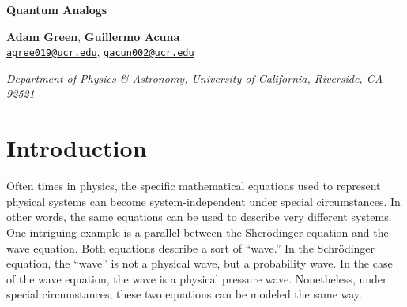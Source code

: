 \documentclass[12pt]{article}
\newcommand{\red}[1]{\textbf{\textcolor{red}{#1}}} %
\newcommand{\email}[1]{\href{mailto:#1}{#1}}
\newenvironment{institutions}[1][2em]{\begin{list}{}{\setlength\leftmargin{#1}\setlength\rightmargin{#1}}\item[]}{\end{list}}
\begin{document}
	
\begin{center}

	{\huge \bf Quantum Analogs}
	
	\vspace{0.5cm}
	
	\textbf{Adam Green}, \textbf{Guillermo Acuna}\\
	
	\texttt{\footnotesize \email{agree019@ucr.edu}},
	\texttt{\footnotesize \email{gacun002@ucr.edu}}
	
	\vspace{0.5cm}
	
	
	\begin{institutions}[2.25cm]
		\footnotesize
		{\it 
			Department of Physics \& Astronomy, 
			University of  California, Riverside, 
			{CA} 92521	    
		}    
	\end{institutions}

	\vspace{0.5cm}
	
\end{center}

	\vspace{0.5cm}

\begin{abstract}
	\red{Condense}
	
	In this experiment, we model the quantum mechanical wavefunction of the Hydrogen atom as a pressure wave inside a spherical cavity. We find that for spherical symmetry, the standing pressure waves inside the cavity are match the Legendre polynomials with a standard error of 0.0360. 
\end{abstract}


\tableofcontents


\section{Introduction}
Often times in physics, the specific mathematical equations used to represent physical systems can become system-independent under special circumstances. In other words, the same equations can be used to describe very different systems. One intriguing example is a parallel between the Shcr\"odinger equation and the wave equation. Both equations describe a sort of ``wave.'' In the Schr\"odinger equation, the ``wave'' is not a physical wave, but a probability wave. In the case of the wave equation, the wave is a physical pressure wave. Nonetheless, under special circumstances, these two equations can be modeled the same way.
\end{document}
